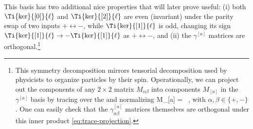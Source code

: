 This basis has two additional nice properties that will later prove useful: (i) both $\Ti{\ker}{[0]}{\ell}$ and $\Ti{\ker}{[2]}{\ell}$ are even (invariant) under the parity swap of two inputs $+\leftrightarrow -$, while $\Ti{\ker}{[1]}{\ell}$ is odd, changing its sign $\Ti{\ker}{[1]}{\ell}\rightarrow -\Ti{\ker}{[1]}{\ell}$ as $+\leftrightarrow -$, and (ii) the $\gamma^{[a]}$ matrices are orthogonal.\footnote{This symmetry decomposition mirrors tensorial decomposition used by physicists to organize particles by their spin.
Operationally, we can project out the components of any $2 \times 2$ matrix $M_{\alpha\beta}$ into components $M_{[a]}$ in the $\gamma^{[a]}$ basis by tracing over the  and normalizing
\be\label{eq:trace-projection}
M_{[a]} =  \, ,
\ee
with $\alpha, \beta \in \{+, - \}$.  One can easily check that the $\gamma^{[a]}_{\alpha\beta}$ matrices themselves are orthogonal under this inner product \eqref{eq:trace-projection}.} 




